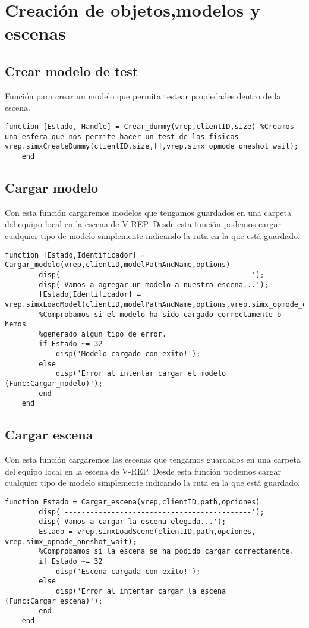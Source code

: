 \section{Creación de objetos,modelos y escenas}
\subsection{Crear modelo de test}
Función para crear un modelo que permita testear propiedades dentro de la escena.
\begin{lstlisting}[frame=single]
function [Estado, Handle] = Crear_dummy(vrep,clientID,size) %Creamos una esfera que nos permite hacer un test de las fisicas       vrep.simxCreateDummy(clientID,size,[],vrep.simx_opmode_oneshot_wait);
    end
\end{lstlisting}
\subsection{Cargar modelo}
Con esta función cargaremos modelos que tengamos guardados en una carpeta del equipo local en la escena de V-REP.
Desde esta función podemos cargar cualquier tipo de modelo simplemente indicando la ruta en la que está guardado.
\begin{lstlisting}[frame=single]
function [Estado,Identificador] = Cargar_modelo(vrep,clientID,modelPathAndName,options)
        disp('--------------------------------------------');
        disp('Vamos a agregar un modelo a nuestra escena...');
        [Estado,Identificador] = vrep.simxLoadModel(clientID,modelPathAndName,options,vrep.simx_opmode_oneshot_wait);
        %Comprobamos si el modelo ha sido cargado correctamente o hemos
        %generado algun tipo de error.
        if Estado ~= 32 
            disp('Modelo cargado con exito!');
        else 
            disp('Error al intentar cargar el modelo (Func:Cargar_modelo)');
        end
    end
\end{lstlisting}
\subsection{Cargar escena}
Con esta función cargaremos las escenas  que tengamos guardados en una carpeta del equipo local en la escena de V-REP.
Desde esta función podemos cargar cualquier tipo de modelo simplemente indicando la ruta en la que está guardado.
\begin{lstlisting}[frame=single]
function Estado = Cargar_escena(vrep,clientID,path,opciones)
        disp('--------------------------------------------');
        disp('Vamos a cargar la escena elegida...');
        Estado = vrep.simxLoadScene(clientID,path,opciones, vrep.simx_opmode_oneshot_wait);
        %Comprobamos si la escena se ha podido cargar correctamente.
        if Estado ~= 32 
            disp('Escena cargada con exito!');
        else 
            disp('Error al intentar cargar la escena (Func:Cargar_escena)');
        end
    end
\end{lstlisting}
